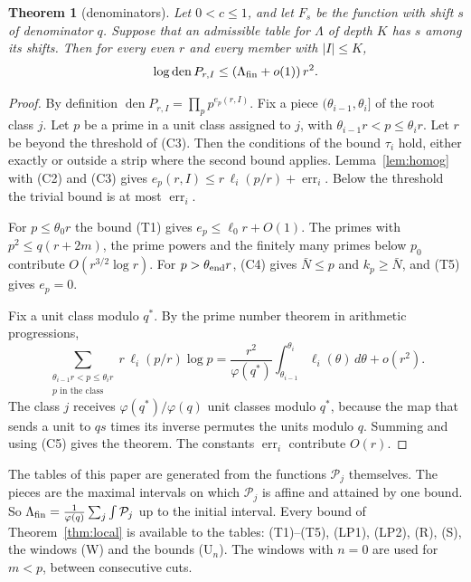 \documentclass[11pt]{amsart}
\newtheorem{theorem}{Theorem}[section]
\theoremstyle{definition}
\theoremstyle{remark}
\numberwithin{equation}{section}
\newcommand{\den}{\operatorname{den}}
\newcommand{\err}{\operatorname{err}}
\begin{document}
\begin{theorem}[denominators]\label{thm:content}
Let $0<c\le1$, and let $F_s$ be the function with shift $s$ of denominator $q$. Suppose that an admissible table for $\Lambda$ of
depth $K$ has $s$ among its shifts. Then for every even $r$ and every member with $|I|\le K$,
\[
 \log\den P_{r,I}\le(\Lambda_{\rm fin}+o(1))\,r^2 .
\]
\end{theorem}
\begin{proof}
By definition $\den P_{r,I}=\prod_pp^{e_p(r,I)}$. Fix a piece $(\theta_{i-1},\theta_i]$ of the root class $j$. Let $p$ be
a prime in a unit class assigned to $j$, with $\theta_{i-1}r<p\le\theta_ir$. Let $r$ be beyond the threshold of (C3).
Then the conditions of the bound $\tau_i$ hold, either exactly or outside a strip where the second bound applies.
Lemma~\ref{lem:homog} with (C2) and (C3) gives $e_p(r,I)\le r\,\ell_i(p/r)+\err_i$. Below the threshold the trivial bound
is at most $\err_i$.

For $p\le\theta_0r$ the bound (T1) gives $e_p\le\ell_0r+O(1)$. The primes with $p^2\le q(r+2m)$, the prime powers and the
finitely many primes below $p_0$ contribute $O(r^{3/2}\log r)$. For $p>\theta_{\rm end}r$, (C4) gives $\bar N\le p$ and
$k_p\ge \bar N$, and (T5) gives $e_p=0$.

Fix a unit class modulo $q^*$. By the prime number theorem in arithmetic progressions,
\[
 \sum_{\substack{\theta_{i-1}r<p\le\theta_ir\\ p\text{ in the class}}}r\,\ell_i(p/r)\log p
 =\frac{r^2}{\varphi(q^*)}\int_{\theta_{i-1}}^{\theta_i}\ell_i(\theta)\,d\theta+o(r^2).
\]
The class $j$ receives $\varphi(q^*)/\varphi(q)$ unit classes modulo $q^*$, because the map that sends a unit to $qs$
times its inverse permutes the units modulo $q$. Summing and using (C5) gives the theorem. The constants $\err_i$
contribute $O(r)$.
\end{proof}

The tables of this paper are generated from the functions $\mathcal P_j$ themselves. The pieces are the maximal intervals
on which $\mathcal P_j$ is affine and attained by one bound. So $\Lambda_{\rm fin}=\frac1{\varphi(q)}\sum_j\int\mathcal P_j$
up to the initial interval. Every bound of Theorem~\ref{thm:local} is available to the tables: (T1)--(T5), (LP1), (LP2), (R), (S),
the windows (W) and the bounds (U$_n$). The windows with $n=0$ are used for $m<p$, between consecutive cuts.
\end{document}

